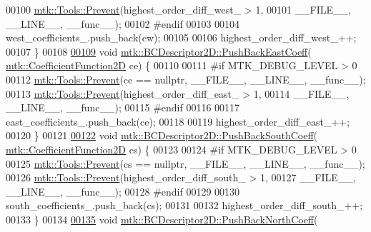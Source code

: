 \begin{DoxyCode}
00100   \hyperlink{classmtk_1_1Tools_a332324c6f25e66be9dff48c5987a3b9f}{mtk::Tools::Prevent}(highest\_order\_diff\_west\_ > 1,
00101                       \_\_FILE\_\_, \_\_LINE\_\_, \_\_func\_\_);
00102 \textcolor{preprocessor}{  #endif}
00103 
00104   west\_coefficients\_.push\_back(cw);
00105 
00106   highest\_order\_diff\_west\_++;
00107 \}
00108 
\hypertarget{mtk__bc__descriptor__2d_8cc_source_l00109}{}\hyperlink{classmtk_1_1BCDescriptor2D_a27635428a6c36d1e305cafdc68271063}{00109} \textcolor{keywordtype}{void} \hyperlink{classmtk_1_1BCDescriptor2D_a27635428a6c36d1e305cafdc68271063}{mtk::BCDescriptor2D::PushBackEastCoeff}(
      \hyperlink{group__c07-mim__ops_gad9e1c0ace886b0029aefffa5f320e852}{mtk::CoefficientFunction2D} ce) \{
00110 
00111 \textcolor{preprocessor}{  #if MTK\_DEBUG\_LEVEL > 0}
00112   \hyperlink{classmtk_1_1Tools_a332324c6f25e66be9dff48c5987a3b9f}{mtk::Tools::Prevent}(ce == \textcolor{keyword}{nullptr}, \_\_FILE\_\_, \_\_LINE\_\_, \_\_func\_\_);
00113   \hyperlink{classmtk_1_1Tools_a332324c6f25e66be9dff48c5987a3b9f}{mtk::Tools::Prevent}(highest\_order\_diff\_east\_ > 1,
00114                       \_\_FILE\_\_, \_\_LINE\_\_, \_\_func\_\_);
00115 \textcolor{preprocessor}{  #endif}
00116 
00117   east\_coefficients\_.push\_back(ce);
00118 
00119   highest\_order\_diff\_east\_++;
00120 \}
00121 
\hypertarget{mtk__bc__descriptor__2d_8cc_source_l00122}{}\hyperlink{classmtk_1_1BCDescriptor2D_a9eb891f14c68968a0113632fa5fea630}{00122} \textcolor{keywordtype}{void} \hyperlink{classmtk_1_1BCDescriptor2D_a9eb891f14c68968a0113632fa5fea630}{mtk::BCDescriptor2D::PushBackSouthCoeff}(
      \hyperlink{group__c07-mim__ops_gad9e1c0ace886b0029aefffa5f320e852}{mtk::CoefficientFunction2D} cs) \{
00123 
00124 \textcolor{preprocessor}{  #if MTK\_DEBUG\_LEVEL > 0}
00125   \hyperlink{classmtk_1_1Tools_a332324c6f25e66be9dff48c5987a3b9f}{mtk::Tools::Prevent}(cs == \textcolor{keyword}{nullptr}, \_\_FILE\_\_, \_\_LINE\_\_, \_\_func\_\_);
00126   \hyperlink{classmtk_1_1Tools_a332324c6f25e66be9dff48c5987a3b9f}{mtk::Tools::Prevent}(highest\_order\_diff\_south\_ > 1,
00127                       \_\_FILE\_\_, \_\_LINE\_\_, \_\_func\_\_);
00128 \textcolor{preprocessor}{  #endif}
00129 
00130   south\_coefficients\_.push\_back(cs);
00131 
00132   highest\_order\_diff\_south\_++;
00133 \}
00134 
\hypertarget{mtk__bc__descriptor__2d_8cc_source_l00135}{}\hyperlink{classmtk_1_1BCDescriptor2D_a0fed58bd058d699a572888fe4b9934a4}{00135} \textcolor{keywordtype}{void} \hyperlink{classmtk_1_1BCDescriptor2D_a0fed58bd058d699a572888fe4b9934a4}{mtk::BCDescriptor2D::PushBackNorthCoeff}(

\end{DoxyCode}
